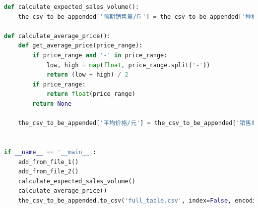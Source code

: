 \documentclass[withoutpreface]{cumcmthesis}
\begin{document}
\begin{appendices}
\begin{lstlisting}[language=python]
def calculate_expected_sales_volume():
    the_csv_to_be_appended['预期销售量/斤'] = the_csv_to_be_appended['种植面积/亩'] * the_csv_to_be_appended['亩产量/斤']

def calculate_average_price():
    def get_average_price(price_range):
        if price_range and '-' in price_range:
            low, high = map(float, price_range.split('-'))
            return (low + high) / 2
        if price_range:
            return float(price_range)
        return None
    
    the_csv_to_be_appended['平均价格/元'] = the_csv_to_be_appended['销售单价/(元/斤)'].apply(get_average_price)


if __name__ == '__main__':
    add_from_file_1()
    add_from_file_2()
    calculate_expected_sales_volume()
    calculate_average_price()
    the_csv_to_be_appended.to_csv('full_table.csv', index=False, encoding='utf-8-sig')


\end{lstlisting}


\end{appendices}
\end{document}

